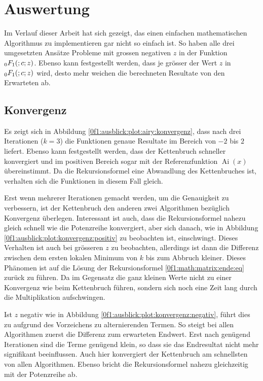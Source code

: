 %
%
%
\section{Auswertung
\label{0f1:section:teil3}}
Im Verlauf dieser Arbeit hat sich gezeigt, 
das einen einfachen mathematischen Algorithmus zu implementieren gar nicht so einfach ist.
So haben alle drei umgesetzten Ansätze Probleme mit grossen negativen $z$ in der Funktion $\mathstrut_0F_1(;c;z)$.
Ebenso kann festgestellt werden, dass je grösser der Wert $z$ in $\mathstrut_0F_1(;c;z)$ wird, desto mehr weichen die berechneten Resultate von den Erwarteten \cite{0f1:wolfram-0f1} ab.

\subsection{Konvergenz
\label{0f1:subsection:konvergenz}}
Es zeigt sich in Abbildung \ref{0f1:ausblick:plot:airy:konvergenz}, dass nach drei Iterationen ($k = 3$) die Funktionen genaue Resultate im Bereich von $-2$ bis $2$ liefert. Ebenso kann festgestellt werden, dass der Kettenbruch schneller konvergiert und im positiven Bereich sogar mit der Referenzfunktion $\operatorname{Ai}(x)$ übereinstimmt. Da die Rekursionsformel eine Abwandlung des Kettenbruches ist, verhalten sich die Funktionen in diesem Fall gleich.

Erst wenn mehrerer Iterationen gemacht werden, um die Genauigkeit zu verbessern, ist der Kettenbruch den anderen zwei Algorithmen bezüglich Konvergenz überlegen. 
Interessant ist auch, dass die Rekursionsformel nahezu gleich schnell wie die Potenzreihe konvergiert, aber sich danach, wie in Abbildung \ref{0f1:ausblick:plot:konvergenz:positiv} zu beobachten ist, einschwingt. Dieses Verhalten ist auch bei grösseren $z$ zu beobachten, allerdings ist dann die Differenz zwischen dem ersten lokalen Minimum von $k$ bis zum Abbruch kleiner.
Dieses Phänomen ist auf die Lösung der Rekursionsformel \eqref{0f1:math:matrix:ende:eq} zurück zu führen. Da im Gegensatz die ganz kleinen Werte nicht zu einer Konvergenz wie beim Kettenbruch führen, sondern sich noch eine Zeit lang durch die Multiplikation aufschwingen.

Ist $z$ negativ wie in Abbildung \ref{0f1:ausblick:plot:konvergenz:negativ}, führt dies zu aufgrund des Vorzeichens zu alternierenden Termen. So steigt bei allen Algorithmen zuerst die Differenz zum erwarteten Endwert. Erst nach genügend Iterationen sind die Terme genügend klein, so dass sie das Endresultat nicht mehr signifikant beeinflussen.
Auch hier konvergiert der Kettenbruch am schnellsten von allen Algorithmen. Ebenso bricht die Rekursionsformel nahezu gleichzeitig mit der Potenzreihe ab.


